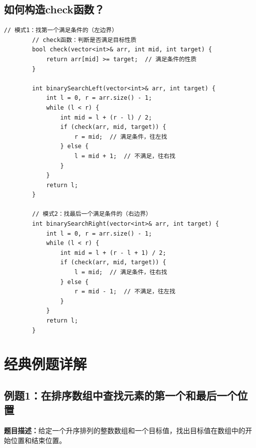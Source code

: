 \documentclass[12pt,a4paper]{article}
\begin{document}
	\subsection{如何构造check函数？}
	
	\begin{lstlisting}[caption={check函数的设计模式}]
		// 模式1：找第一个满足条件的（左边界）
		// check函数：判断是否满足目标性质
		bool check(vector<int>& arr, int mid, int target) {
			return arr[mid] >= target;  // 满足条件的性质
		}
		
		int binarySearchLeft(vector<int>& arr, int target) {
			int l = 0, r = arr.size() - 1;
			while (l < r) {
				int mid = l + (r - l) / 2;
				if (check(arr, mid, target)) {
					r = mid;  // 满足条件，往左找
				} else {
					l = mid + 1;  // 不满足，往右找
				}
			}
			return l;
		}
		
		// 模式2：找最后一个满足条件的（右边界）
		int binarySearchRight(vector<int>& arr, int target) {
			int l = 0, r = arr.size() - 1;
			while (l < r) {
				int mid = l + (r - l + 1) / 2;
				if (check(arr, mid, target)) {
					l = mid;  // 满足条件，往右找
				} else {
					r = mid - 1;  // 不满足，往左找
				}
			}
			return l;
		}
	\end{lstlisting}
	
	\section{经典例题详解}
	
	\subsection{例题1：在排序数组中查找元素的第一个和最后一个位置}
	
	\textbf{题目描述：}给定一个升序排列的整数数组和一个目标值，找出目标值在数组中的开始位置和结束位置。
	
\end{document}
